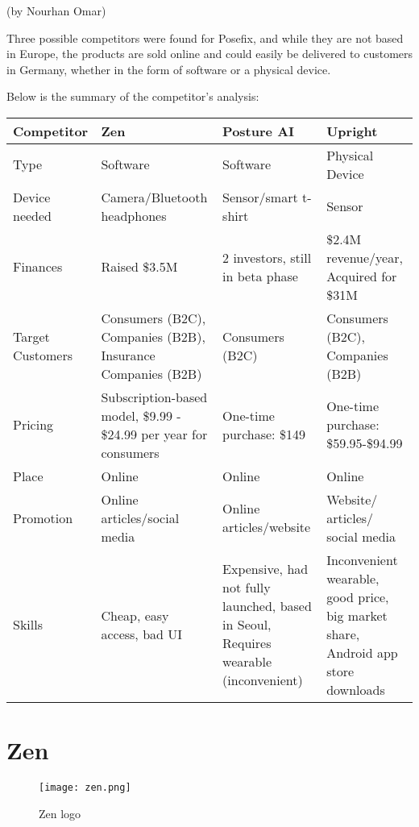 (by Nourhan Omar)

\p
Three possible competitors were found for Posefix, and while they are not based in Europe, 
the products are sold online and could easily be delivered to customers in Germany, whether in the form of software or a physical device.

Below is the summary of the competitor's analysis:

\begin{table}[ht]
    \centering
    \begin{tabular}{|p{3cm}|p{3cm}|p{3cm}|p{3cm}|}
        \hline
        \textbf{Competitor} & \textbf{Zen} & \textbf{Posture AI} & \textbf{Upright} \\
        \hline
        Type & Software & Software & Physical Device \\
        \hline
        Device needed & Camera/Bluetooth headphones & Sensor/smart t-shirt & Sensor \\
        \hline
        Finances & Raised \$3.5M & 2 investors, still in beta phase & \$2.4M revenue/year, Acquired for \$31M \\
        \hline
        Target Customers & Consumers (B2C), Companies (B2B), Insurance Companies (B2B) & Consumers (B2C) & Consumers (B2C), Companies (B2B) \\
        \hline
        Pricing & Subscription-based model, \$9.99 - \$24.99 per year for consumers & One-time purchase: \$149 & One-time purchase: \$59.95-\$94.99 \\
        \hline
        Place & Online & Online & Online \\
        \hline
        Promotion & Online articles/social media & Online articles/website & Website/ articles/ social media \\
        \hline
        Skills & Cheap, easy access, bad UI & Expensive, had not fully launched, based in Seoul, Requires wearable (inconvenient) & Inconvenient wearable, good price, big market share, Android app store downloads \\
        \hline
    \end{tabular}
\end{table}    

\section{Zen}

\begin{figure}[H]
    \centering
    \texttt{[image: zen.png]}
    \caption{Zen logo}
    \label{fig:zen}
\end{figure}

